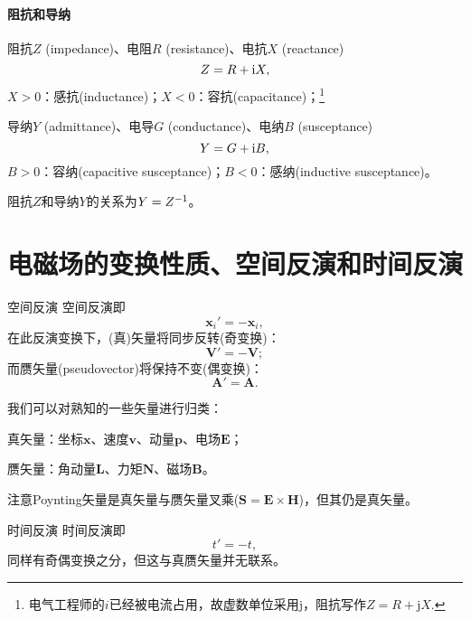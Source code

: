 \paragraph{阻抗和导纳}
阻抗$Z$ (impedance)、电阻$R$ (resistance)、电抗$X$ (reactance)
\[
    Z=R+\mathrm{i} X,
\]
$X>0$：感抗(inductance)；$X<0$：容抗(capacitance)；\footnote{电气工程师的$i$已经被电流占用，故虚数单位采用j，阻抗写作$Z=R+\mathrm j X.$}

导纳$Y$ (admittance)、电导$G$ (conductance)、电纳$B$ (susceptance)
\[
    Y=G+\mathrm{i} B,
\]
$B>0$：容纳(capacitive susceptance)；$B<0$：感纳(inductive susceptance)。

阻抗$Z$和导纳$Y$的关系为$Y=Z^{-1}$。
\section{电磁场的变换性质、空间反演和时间反演}
\begin{definition}{空间反演}{}
    空间反演即
    \[
        \bm x_i'=-\bm x_i,
    \]
    在此反演变换下，(真)矢量将同步反转(奇变换)：
    \[
        \bm V'=-\bm V;
    \]
    而赝矢量(pseudovector)将保持不变(偶变换)：
    \[
        \bm A'=\bm A.
    \]
\end{definition}
我们可以对熟知的一些矢量进行归类：
\begin{compactitem}
	\item 真矢量：坐标$\bm x$、速度$\bm v$、动量$\bm p$、电场$\bm E$；
	\item 赝矢量：角动量$\bm L$、力矩$\bm N$、磁场$\bm B$。
\end{compactitem}
注意Poynting矢量是真矢量与赝矢量叉乘($\bm S=\bm E\times\bm H$)，但其仍是真矢量。
\begin{definition}{时间反演}{}
    时间反演即
    \[
        t'=-t,
    \]
    同样有奇偶变换之分，但这与真赝矢量并无联系。
\end{definition}

